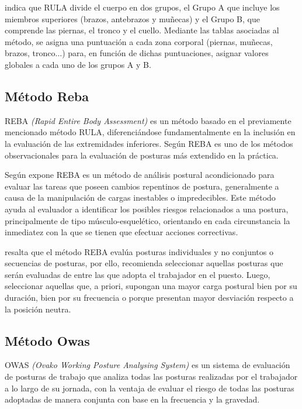 \parencite{Diego-Mas2015EvaluacionRULA} indica que RULA divide el cuerpo en dos grupos, el Grupo A que incluye los miembros superiores (brazos, antebrazos y muñecas) y el Grupo B, que comprende las piernas, el tronco y el cuello. Mediante las tablas asociadas al método, se asigna una puntuación a cada zona corporal (piernas, muñecas, brazos, tronco...) para, en función de dichas puntuaciones, asignar valores globales a cada uno de los grupos A y B.
\subsection{Método Reba}
REBA \textit{(Rapid Entire Body Assessment)} es un método basado en el previamente mencionado método RULA, diferenciándose fundamentalmente en la inclusión en la evaluación de las extremidades inferiores. Según \parencite{Diego-Mas2015EvaluacionREBA} REBA es uno de los métodos observacionales para la evaluación de posturas más extendido en la práctica.

Según expone \parencite{Hignett2000RapidREBA} REBA es un método de análisis postural acondicionado para evaluar las tareas que poseen cambios repentinos de postura, generalmente a causa de la manipulación de cargas inestables o impredecibles. Este método ayuda al evaluador a identificar los posibles riesgos relacionados a una postura, principalmente de tipo músculo-esquelético, orientando en cada circunstancia la inmediatez con la que se tienen que efectuar acciones correctivas.

\parencite{Diego-Mas2015EvaluacionREBA} resalta que el método REBA evalúa posturas individuales y no conjuntos o secuencias de posturas, por ello, recomienda seleccionar aquellas posturas que serán evaluadas de entre las que adopta el trabajador en el puesto. Luego, seleccionar aquellas que, a priori, supongan una mayor carga postural bien por su duración, bien por su frecuencia o porque presentan mayor desviación respecto a la posición neutra.
\subsection{Método Owas}
OWAS \textit{(Ovako Working Posture Analysing System)} es un sistema de evaluación de posturas de trabajo que analiza todas las posturas realizadas por el trabajador a lo largo de su jornada, con la ventaja de evaluar el riesgo de todas las posturas adoptadas de manera conjunta con base en la frecuencia y la gravedad.\parencite{MattilaMVilkki1999OccupationalSystems}

